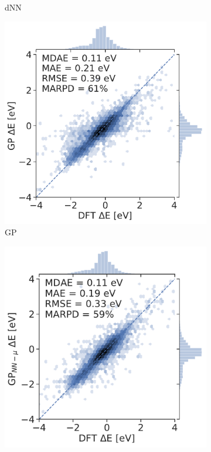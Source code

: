 \documentclass[]{achemso}
\begin{document}
\begin{figure}
\begin{subfigure}{0.32\textwidth}
        \caption{\gls{dNN}}\label{fig:parity_dnn}
    \end{subfigure}
    \begin{subfigure}{0.32\textwidth}
        \includegraphics[width=\textwidth]{../GP/Matern/parity.pdf}
        \caption{\gls{GP}}\label{fig:parity_gp}
    \end{subfigure}
    \begin{subfigure}{0.32\textwidth}
        \includegraphics[width=\textwidth]{../GPnnm/Matern/parity.pdf}

\end{subfigure}
\end{figure}
\end{document}
